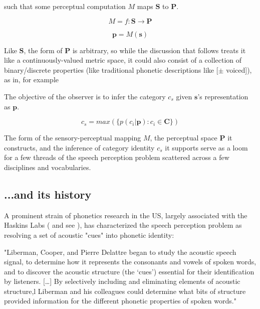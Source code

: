 \begin{multicols}{2}
such that some perceptual computation $M$ maps $\mathbf{S}$ to $\mathbf{P}$.

\begin{equation}
\label{eqn:map}
M = f: \mathbf{S} \to \mathbf{P}
\end{equation} 

\begin{equation}
\label{eqn:pfroms}
\mathbf{p} = M(\mathbf{s})
\end{equation}

Like $\mathbf{S}$, the form of $\mathbf{P}$ is arbitrary, so while the discussion that follows treats it like a continuously-valued metric space, it could also consist of a collection of binary/discrete properties (like traditional phonetic descriptions like [$\pm$ voiced]), as in, for example \cite{Tversky1977,leeExtendingALCOVEModel2002}

The objective of the observer is to infer the category $c_s$ given $\mathbf{s}$'s representation as $\mathbf{p}$.

\begin{equation}
\label{eqn:infer}
c_s = max( \{ p(c_i | \mathbf{p}) : c_i \in \mathbf{C} \})
\end{equation}

The form of the sensory-perceptual mapping $M$, the perceptual space $\mathbf{P}$ it constructs, and the inference of category identity $c_s$ it supports serve as a loom for a few threads of the speech perception problem scattered across a few disciplines and vocabularies.

\subsection{...and its history}


A prominent strain of phonetics research in the US, largely associated with the Haskins Labs (\cite{schertzPhoneticCueWeighting2020} and see \cite[p.~51]{ohalaGuideHistoryPhonetic1999}), has characterized the speech perception problem as resolving a set of acoustic "cues" into phonetic identity:

\begin{leftbar}
"Liberman, Cooper, and Pierre Delattre began to study the acoustic speech signal, to determine how it represents the consonants and vowels of spoken words, and to discover the acoustic structure (the `cues') essential for their identification by listeners. [\dots] By selectively including and eliminating elements of acoustic structure,l Liberman and his colleagues could determine what bits of structure provided information for the different phonetic properties of spoken words."


\end{leftbar}
\end{multicols}
